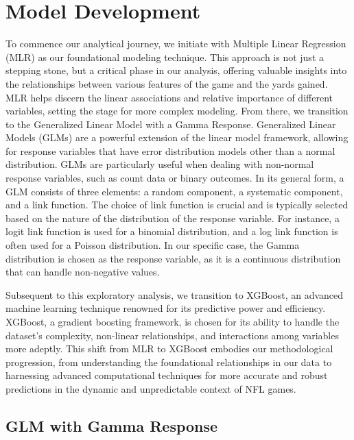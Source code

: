 \documentclass[
  super,
  preprint,
  3p]{elsarticle}
\begin{document}
\hypertarget{model-development}{%
\section{Model Development}\label{model-development}}

To commence our analytical journey, we initiate with Multiple Linear
Regression (MLR) as our foundational modeling technique. This approach
is not just a stepping stone, but a critical phase in our analysis,
offering valuable insights into the relationships between various
features of the game and the yards gained. MLR helps discern the linear
associations and relative importance of different variables, setting the
stage for more complex modeling. From there, we transition to the
Generalized Linear Model with a Gamma Response. Generalized Linear
Models (GLMs) are a powerful extension of the linear model framework,
allowing for response variables that have error distribution models
other than a normal distribution. GLMs are particularly useful when
dealing with non-normal response variables, such as count data or binary
outcomes. In its general form, a GLM consists of three elements: a
random component, a systematic component, and a link function. The
choice of link function is crucial and is typically selected based on
the nature of the distribution of the response variable. For instance, a
logit link function is used for a binomial distribution, and a log link
function is often used for a Poisson distribution. In our specific case,
the Gamma distribution is chosen as the response variable, as it is a
continuous distribution that can handle non-negative values.

Subsequent to this exploratory analysis, we transition to XGBoost, an
advanced machine learning technique renowned for its predictive power
and efficiency. XGBoost, a gradient boosting framework, is chosen for
its ability to handle the dataset's complexity, non-linear
relationships, and interactions among variables more adeptly. This shift
from MLR to XGBoost embodies our methodological progression, from
understanding the foundational relationships in our data to harnessing
advanced computational techniques for more accurate and robust
predictions in the dynamic and unpredictable context of NFL games.

\hypertarget{glm-with-gamma-response}{%
\subsection{GLM with Gamma Response}\label{glm-with-gamma-response}}
\end{document}
